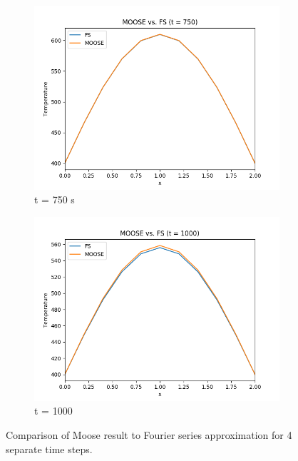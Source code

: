 \documentclass[12pt]{article}
\begin{document}
\begin{figure}[h]
    ~ %
    \begin{subfigure}[b]{0.4\textwidth}
        \includegraphics[width=\textwidth]{t750.png}
        \caption{t = 750 s}
        \label{fig:t750}
    \end{subfigure}
        \begin{subfigure}[b]{0.4\textwidth}
        \includegraphics[width=\textwidth]{t1000.png}
        \caption{t = 1000}
        \label{fig:t1000}
    \end{subfigure}
    \caption{Comparison of Moose result to Fourier series approximation for 4 separate time steps.}\label{fig:T}
\end{figure}
\end{document}
